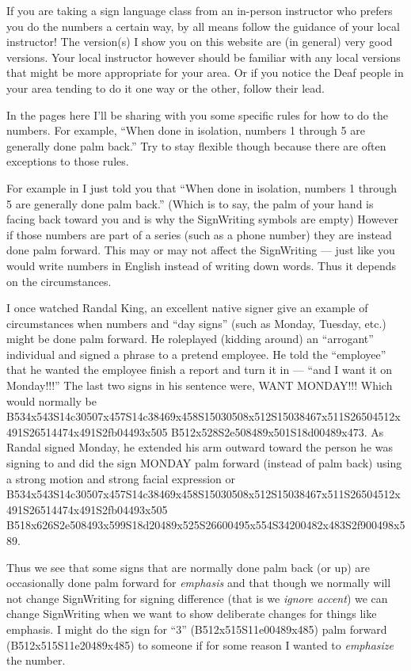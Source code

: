 \documentclass{article}
\begin{document}
If you are taking a sign language class from an in-person instructor who prefers you do the numbers a certain way, by all means follow the guidance of your local instructor!
The version(s) I show you on this website are (in general) very good versions.
Your local instructor however should be familiar with any local versions that might be more appropriate for your area.
Or if you notice the Deaf people in your area tending to do it one way or the other, follow their lead.

In the pages here I'll be sharing with you some specific rules for how to do the numbers.
For example, ``When done in isolation, numbers 1 through 5 are generally done palm back.''
Try to stay flexible though because there are often exceptions to those rules.

For example in I just told you that ``When done in isolation, numbers 1 through 5 are generally done palm back.''
(Which is to say, the palm of your hand is facing back toward you and is why the SignWriting symbols are empty)
However if those numbers are part of a series (such as a phone number) they are instead done palm forward.
This may or may not affect the SignWriting --- just like you would write numbers in English instead of writing down words.
Thus it depends on the circumstances.

I once watched Randal King, an excellent native signer give an example of circumstances when numbers and ``day signs'' (such as Monday, Tuesday, etc.) might be done palm forward.
He roleplayed (kidding around) an ``arrogant'' individual and signed a phrase to a pretend employee.
He told the ``employee'' that he wanted the employee finish a report and turn it in --- ``and I want it on Monday!!!''
The last two signs in his sentence were, WANT MONDAY!!!
Which would normally be B534x543S14c30507x457S14c38469x458S15030508x512S15038467x511S26504512x491S26514474x491S2fb04493x505 B512x528S2e508489x501S18d00489x473.
As Randal signed Monday, he extended his arm outward toward the person he was signing to and did the sign MONDAY palm forward (instead of palm back) using a strong motion and strong facial expression or B534x543S14c30507x457S14c38469x458S15030508x512S15038467x511S26504512x491S26514474x491S2fb04493x505 B518x626S2e508493x599S18d20489x525S26600495x554S34200482x483S2f900498x589.

Thus we see that some signs that are normally done palm back (or up) are occasionally done palm forward for \emph{emphasis} and that though we normally will not change SignWriting for signing difference (that is we \emph{ignore accent}) we can change SignWriting when we want to show deliberate changes for things like emphasis.
I might do the sign for ``3'' (B512x515S11e00489x485) palm forward (B512x515S11e20489x485) to someone if for some reason I wanted to \emph{emphasize} the number.
\end{document}
